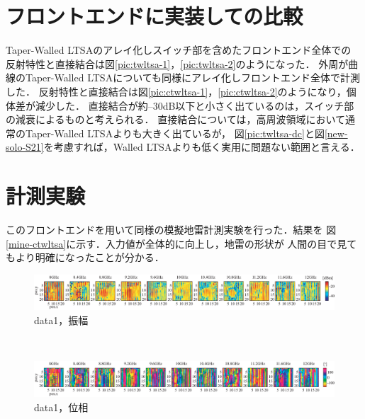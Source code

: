 ﻿\documentclass[12pt,oneside]{jsbook}
\begin{document}
\section{フロントエンドに実装しての比較}
Taper-Walled LTSAのアレイ化しスイッチ部を含めたフロントエンド全体での
反射特性と直接結合は図\ref{pic:twltsa-1}，\ref{pic:twltsa-2}のようになった．
外周が曲線のTaper-Walled LTSAについても同様にアレイ化しフロントエンド全体で計測した．
反射特性と直接結合は図\ref{pic:ctwltsa-1}，\ref{pic:ctwltsa-2}のようになり，個体差が減少した．
直接結合が約--30dB以下と小さく出ているのは，スイッチ部の減衰によるものと考えられる．
直接結合については，高周波領域において通常のTaper-Walled LTSAよりも大きく出ているが，
図\ref{pic:twltsa-dc}と図\ref{new-solo-S21}を考慮すれば，Walled LTSAよりも低く実用に問題ない範囲と言える．
\clearpage
\section{計測実験}
このフロントエンドを用いて同様の模擬地雷計測実験を行った．結果を
図\ref{mine-ctwltsa}に示す．入力値が全体的に向上し，地雷の形状が
人間の目で見てもより明確になったことが分かる．
\begin{figure}[hbtp]
 \begin{center}
     \begin{minipage}[c]{\hsize}
\includegraphics[width = \hsize ]{20170205_mine1_a.eps}
\centering\textmd{data1，振幅}
  \end{minipage}
\\
     \begin{minipage}[c]{\hsize}
\includegraphics[width = \hsize ]{20170205_mine1_p.eps}
\centering\textmd{data1，位相}
  \end{minipage}
\end{center}
\end{figure}
\end{document}
